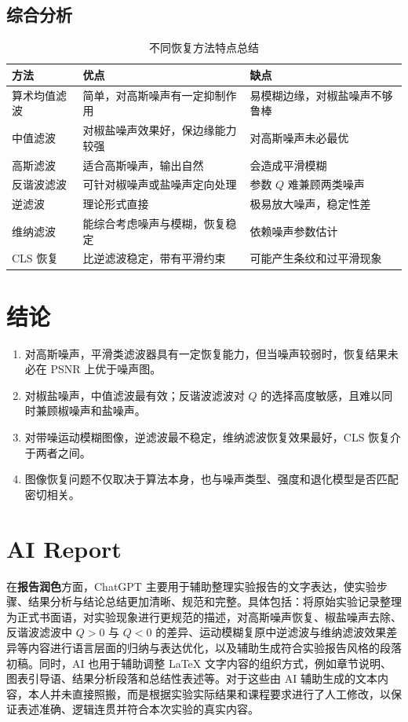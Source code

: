 \documentclass[UTF8,a4paper,12pt]{ctexart}
\begin{document}
\subsection{综合分析}
\begin{table}[H]
\centering
\caption{不同恢复方法特点总结}
\begin{tabular}{p{3cm}p{5cm}p{5cm}}
\toprule
方法 & 优点 & 缺点 \\
\midrule
算术均值滤波 & 简单，对高斯噪声有一定抑制作用 & 易模糊边缘，对椒盐噪声不够鲁棒 \\
中值滤波 & 对椒盐噪声效果好，保边缘能力较强 & 对高斯噪声未必最优 \\
高斯滤波 & 适合高斯噪声，输出自然 & 会造成平滑模糊 \\
反谐波滤波 & 可针对椒噪声或盐噪声定向处理 & 参数 $Q$ 难兼顾两类噪声 \\
逆滤波 & 理论形式直接 & 极易放大噪声，稳定性差 \\
维纳滤波 & 能综合考虑噪声与模糊，恢复稳定 & 依赖噪声参数估计 \\
CLS 恢复 & 比逆滤波稳定，带有平滑约束 & 可能产生条纹和过平滑现象 \\
\bottomrule
\end{tabular}
\end{table}

\section{结论}
\begin{enumerate}
  \item 对高斯噪声，平滑类滤波器具有一定恢复能力，但当噪声较弱时，恢复结果未必在 PSNR 上优于噪声图。
  \item 对椒盐噪声，中值滤波最有效；反谐波滤波对 $Q$ 的选择高度敏感，且难以同时兼顾椒噪声和盐噪声。
  \item 对带噪运动模糊图像，逆滤波最不稳定，维纳滤波恢复效果最好，CLS 恢复介于两者之间。
  \item 图像恢复问题不仅取决于算法本身，也与噪声类型、强度和退化模型是否匹配密切相关。
\end{enumerate}

\section*{AI Report}
在\textbf{报告润色}方面，ChatGPT 主要用于辅助整理实验报告的文字表达，使实验步骤、结果分析与结论总结更加清晰、规范和完整。具体包括：将原始实验记录整理为正式书面语，对实验现象进行更规范的描述，对高斯噪声恢复、椒盐噪声去除、反谐波滤波中 $Q>0$ 与 $Q<0$ 的差异、运动模糊复原中逆滤波与维纳滤波效果差异等内容进行语言层面的归纳与表达优化，以及辅助生成符合实验报告风格的段落初稿。同时，AI 也用于辅助调整 LaTeX 文字内容的组织方式，例如章节说明、图表引导语、结果分析段落和总结性表述等。对于这些由 AI 辅助生成的文本内容，本人并未直接照搬，而是根据实验实际结果和课程要求进行了人工修改，以保证表述准确、逻辑连贯并符合本次实验的真实内容。
\end{document}
